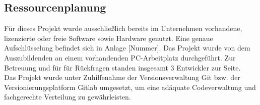 \subsection{Ressourcenplanung}
    Für dieses Projekt wurde ausschließlich bereits im Unternehmen vorhandene, lizenzierte oder freie Software sowie Hardware genutzt. Eine genaue Aufschlüsselung befindet sich in Anlage [Nummer]. Das Projekt wurde von dem Auszubildenden an einem vorhandenden PC-Arbeitplatz durchgeführt. Zur Betreuung und für für Rückfragen standen insgesamt 3 Entwickler zur Seite.\\
    Das Projekt wurde unter Zuhilfenahme der Versionsverwaltung Git bzw. der Versionierungsplatform Gitlab umgesetzt, um eine adäquate Codeverwaltung und fachgerechte Verteilung zu gewährleisten.

\vfill